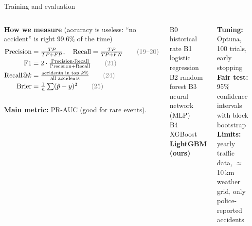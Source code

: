 \documentclass[aspectratio=169,11pt,t]{beamer}
\begin{document}
\begin{frame}{Training and evaluation}
\vspace{-2mm}
\begin{center}
\end{center}
\vspace{-1mm}
\begin{columns}[T,onlytextwidth]
\begin{softbox}\scriptsize
\textbf{How we measure} (accuracy is useless: ``no accident'' is right 99.6\% of the time)
\vspace{-2mm}
\begin{align*}
\text{Precision}&=\tfrac{TP}{TP+FP}, \quad \text{Recall}=\tfrac{TP}{TP+FN} \tag*{\color{black!55}(19--20)}\\
\text{F1}&=2\cdot\tfrac{\text{Precision}\cdot\text{Recall}}{\text{Precision}+\text{Recall}} \tag*{\color{black!55}(21)}\\
\text{Recall@}k&=\tfrac{\text{accidents in top }k\%}{\text{all accidents}} \tag*{\color{black!55}(24)}\\
\text{Brier}&=\tfrac{1}{n}\textstyle\sum(\hat p-y)^2 \tag*{\color{black!55}(25)}
\end{align*}
\vspace{-6mm}\\
\textbf{Main metric:} PR-AUC (good for rare events).
\end{softbox}
\begin{keybox}[title=We compare with]
\scriptsize
B0 historical rate \;\textbullet\; B1 logistic regression\\
B2 random forest \;\textbullet\; B3 neural network (MLP)\\
B4 XGBoost \;\textbullet\; \textbf{LightGBM (ours)}
\end{keybox}
\vspace{-1mm}
\begin{softbox}\scriptsize
\textbf{Tuning:} Optuna, 100 trials, early stopping\\
\textbf{Fair test:} 95\% confidence intervals with block bootstrap\\
\textbf{Limits:} yearly traffic data, $\approx$10\,km weather grid, only police-reported accidents
\end{softbox}
\end{columns}
\end{frame}
\end{document}
